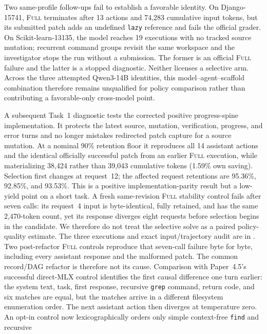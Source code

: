 \documentclass[11pt]{article}
\begin{document}
Two same-profile follow-ups fail to establish a favorable identity.  On
Django-15741, \textsc{Full} terminates after 13 actions and 74,283 cumulative
input tokens, but its submitted patch adds an undefined \texttt{lazy} reference
and fails the official grader.  On Scikit-learn-13135, the model reaches 19
executions with no tracked source mutation; recurrent command groups revisit
the same workspace and the investigator stops the run without a submission.
The former is an official \textsc{Full} failure and the latter is a stopped
diagnostic.  Neither licenses a selective arm.  Across the three attempted
Qwen3-14B identities, this model--agent--scaffold combination therefore remains
unqualified for policy comparison rather than contributing a favorable-only
cross-model point.

A subsequent Task~1 diagnostic tests the corrected positive progress-spine
implementation.  It protects the latest source, mutation, verification,
progress, and error turns and no longer mistakes redirected patch capture for
a source mutation.  At a nominal 90\% retention floor it reproduces all 14
assistant actions and the identical officially successful patch from an
earlier \textsc{Full} execution, while materializing 38,424 rather than
39,043 cumulative tokens (1.59\% own saving).  Selection first changes at
request~12; the affected request retentions are 95.36\%, 92.85\%, and 93.53\%.
This is a positive implementation-parity result but a low-yield point on a
short task.  A fresh same-revision \textsc{Full} stability control fails after
seven calls: its request~4 input is byte-identical, fully retained, and has the
same 2,470-token count, yet its response diverges eight requests before
selection begins in the candidate.  We therefore do not treat the selective
solve as a paired policy-quality estimate.  The three executions and exact
input/trajectory audit are in
.
Two post-refactor \textsc{Full} controls reproduce that seven-call failure
byte for byte, including every assistant response and the malformed patch.
The common record/DAG refactor is therefore not its cause.  Comparison with
Paper~4.5's successful direct-MLX control identifies the first causal
difference one turn earlier: the system text, task, first response, recursive
\texttt{grep} command, return code, and six matches are equal, but the matches
arrive in a different filesystem enumeration order.  The next assistant
action then diverges at temperature zero.  An opt-in control now
lexicographically orders only simple context-free \texttt{find} and recursive
\end{document}
